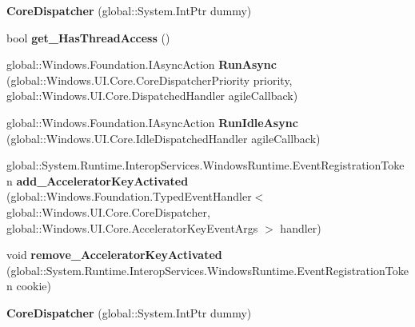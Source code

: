 \begin{DoxyCompactItemize}
{\bfseries Core\+Dispatcher} (global\+::\+System.\+Int\+Ptr dummy)
\item 
\mbox{\label{class_windows_1_1_u_i_1_1_core_1_1_core_dispatcher_aae3a5de5404c93a4fced870962f00905}} 
bool {\bfseries get\+\_\+\+Has\+Thread\+Access} ()
\item 
\mbox{\label{class_windows_1_1_u_i_1_1_core_1_1_core_dispatcher_ab32476eaa8140ce65276d22b3ca91205}} 
global\+::\+Windows.\+Foundation.\+I\+Async\+Action {\bfseries Run\+Async} (global\+::\+Windows.\+U\+I.\+Core.\+Core\+Dispatcher\+Priority priority, global\+::\+Windows.\+U\+I.\+Core.\+Dispatched\+Handler agile\+Callback)
\item 
\mbox{\label{class_windows_1_1_u_i_1_1_core_1_1_core_dispatcher_ae1d81c29e61aa9d3e601781f291624c6}} 
global\+::\+Windows.\+Foundation.\+I\+Async\+Action {\bfseries Run\+Idle\+Async} (global\+::\+Windows.\+U\+I.\+Core.\+Idle\+Dispatched\+Handler agile\+Callback)
\item 
\mbox{\label{class_windows_1_1_u_i_1_1_core_1_1_core_dispatcher_ae59e989cb2be9847e256c8717dcf0763}} 
global\+::\+System.\+Runtime.\+Interop\+Services.\+Windows\+Runtime.\+Event\+Registration\+Token {\bfseries add\+\_\+\+Accelerator\+Key\+Activated} (global\+::\+Windows.\+Foundation.\+Typed\+Event\+Handler$<$ global\+::\+Windows.\+U\+I.\+Core.\+Core\+Dispatcher, global\+::\+Windows.\+U\+I.\+Core.\+Accelerator\+Key\+Event\+Args $>$ handler)
\item 
\mbox{\label{class_windows_1_1_u_i_1_1_core_1_1_core_dispatcher_a96732786d7ff5dad968e1ed05e297c99}} 
void {\bfseries remove\+\_\+\+Accelerator\+Key\+Activated} (global\+::\+System.\+Runtime.\+Interop\+Services.\+Windows\+Runtime.\+Event\+Registration\+Token cookie)
\item 
\mbox{\label{class_windows_1_1_u_i_1_1_core_1_1_core_dispatcher_a88a12a752cb9f80bb154d5d4f57d0d75}} 
{\bfseries Core\+Dispatcher} (global\+::\+System.\+Int\+Ptr dummy)
\item 
\mbox{\label{class_windows_1_1_u_i_1_1_core_1_1_core_dispatcher_aae3a5de5404c93a4fced870962f00905}} 

\end{DoxyCompactItemize}
